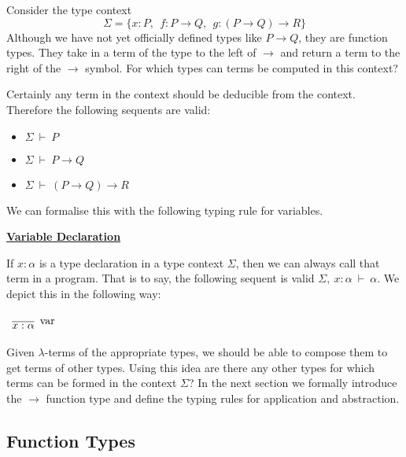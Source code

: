 \documentclass{book}
\begin{document}
    \begin{eg}{}        
        Consider the type context $$\Sigma = \{x : P, \ \ f : P \to Q, \ \ g : (P \to Q) \to R\}$$ Although we have not yet officially defined types like $P \to Q$, they are function types. They take in a term of the type to the left of $\to$ and return a term to the right of the $\to$ symbol. For which types can terms be computed in this context?

        Certainly any term in the context should be deducible from the context. Therefore the following sequents are valid: 

        \begin{itemize}
            \item[] $\Sigma \ \vdash \ P$
            \item[] $\Sigma \ \vdash \ P \to Q$
            \item[] $\Sigma \ \vdash \ (P \to Q) \to R$
        \end{itemize}

        We can formalise this with the following typing rule for variables.

            \underline{{\bf Variable Declaration}}
            
            If $x : \alpha$ is a type declaration in a type context $\Sigma$, then we can always call that term in a program. That is to say, the following sequent is valid $\Sigma, \ x : \alpha \ \vdash \ \alpha$. We depict this in the following way:
          
            \begin{center}
              $\begin{array}{c}
                  \infer[\var]{x : \alpha}{\vspace{0.2cm}}
              \end{array}$
            \end{center}

        Given $\lambda$-terms of the appropriate types, we should be able to compose them to get terms of other types. Using this idea are there any other types for which terms can be formed in the context $\Sigma$? In the next section we formally introduce the $\to$ function type and define the typing rules for application and abstraction. 

    \end{eg}
    
    \newpage
    \subsection*{Function Types}
\end{document}
